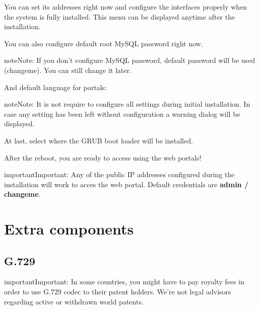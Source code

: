 \documentclass[letterpaper,10pt,english]{sphinxmanual}
\begin{document}
You can set its addresses right now and configure the interfaces properly when
the system is fully installed. This menu can be displayed anytime after the
installation.

\noindent{}

You can also configure default root MySQL password right now.

\begin{notice}{note}{Note:}
If you don't configure MySQL password, default password will be used
(changeme). You can still change it later.
\end{notice}

\noindent{}

And default language for portals:

\noindent{}

\begin{notice}{note}{Note:}
It is not require to configure all settings during initial
installation. In case any setting has been left without configuration a
warning dialog will be displayed.
\end{notice}

\noindent{}

At last, select where the GRUB boot loader will be installed.

\noindent{}

After the reboot, you are ready to access using the web portals!

\begin{notice}{important}{Important:}
Any of the public IP addresses configured during the
installation will work to acces the web portal. Default credentials are
\textbf{admin / changeme}.
\end{notice}


\section{Extra components}
\label{basics/installation/extra_components::doc}\label{basics/installation/extra_components:extra-components}

\subsection{G.729}
\label{basics/installation/extra_components:g-729}
\begin{notice}{important}{Important:}
In some countries, you might have to pay royalty fees in order to
use G.729 codec to their patent holders. We're not legal advisors regarding
active or withdrawn world patents.
\end{notice}
\end{document}
